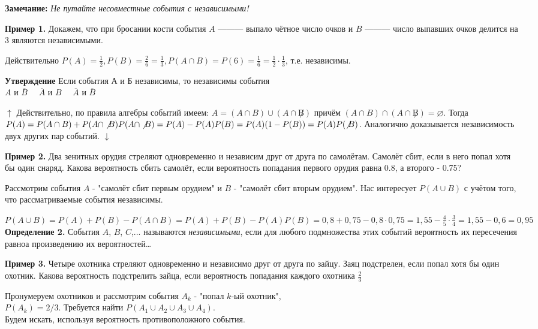 \documentclass{article}
\begin{document}
    \textbf{Замечание:} \textit{Не путайте несовместные события с независимыми!}

    \textbf{Пример 1.} Докажем, что при бросании кости события $A$ ——— выпало чётное число очков и $B$ ——— число выпавших очков делится на 3 являются независимыми.

    Действительно \(P(A) = \frac{1}{2}, P(B) = \frac{2}{6} = \frac{1}{3}, P(A \cap B) = P(6) = \frac{1}{6} = \frac{1}{2} \cdot \frac{1}{3}\), т.е. независимы. 


    \textbf{Утверждение} Если события А и Б независимы, то независимы события\\
    $A$ и $\overline{B}$ \ \ $\overline{A}$ и $B$ \ \ $\overline{A}$ и $\overline{B}$

    \(\uparrow\) Действительно, по правила алгебры событий имеем:
    \( A = (A \cap B) \cup (A \cap \not B)\) причём \( (A \cap B) \cap (A \cap \not B) = \varnothing\).
    Тогда \( P(A) = P(A \cap B) + P(A \cap \not B) \\ P(A \cap \not B) = P(A) - P(A)P(B) = P(A)(1 - P(B)) = P(A)P(\not B)\).
    Аналогично доказывается независимость двух других пар событий. \(\downarrow\)


    \textbf{Пример 2.} Два зенитных орудия стреляют одновременно и независим друг от друга по самолётам. Самолёт сбит, если в него попал хотя бы один снаряд. Какова вероятность сбить самолёт, если вероятность попадания первого орудия равна 0.8, а второго - 0.75?

    Рассмотрим события
    $A$ - "самолёт сбит первым орудием" и $B$ - "самолёт сбит вторым орудием".
    Нас интересует \(P(A \cup B)\) с учётом того, что рассматриваемые события независимы.

    \(P(A \cup B) = P(A) + P(B) - P(A \cap B) = P(A) + P(B) - P(A)P(B) = 0,8 + 0,75 - 0,8 \cdot 0,75 = 1,55 - \frac{4}{5} \cdot \frac{3}{4} = 1,55 - 0,6 = 0,95\)
    \textbf{Определение 2.} События $A$, $B$, $C$,... называются \textit{независимыми}, если для любого подмножества этих событий вероятность их пересечения равноа произведению их вероятностей\dots

    \textbf{Пример 3.} Четыре охотника стреляют одновременно и независимо друг от друга по зайцу. 
    Заяц подстрелен, если попал хотя бы один охотник. Какова вероятность подстрелить зайца, если вероятность попадания каждого охотника \(\frac{2}{3}\)

    Пронумеруем охотников и рассмотрим события $A_k$ - "попал $k$-ый охотник",\\
    \(P(A_k) = 2/3\). Требуется найти \(P(A_1 \cup A_2 \cup A_3 \cup A_4)\).\\
    Будем искать, используя вероятность противоположного события. 
\end{document}
